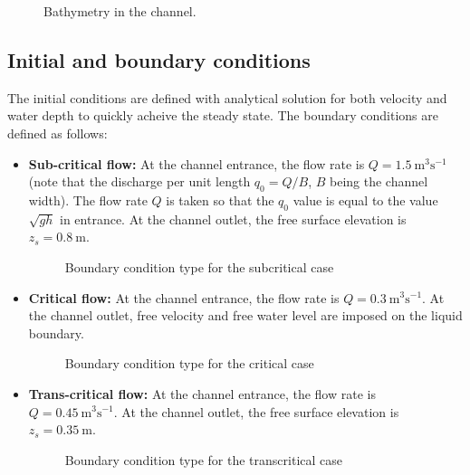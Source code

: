 \begin{figure}[H]
 \centering
 \caption{Bathymetry in the channel.}
 \label{t2d:bumpsub:fig:baty}
\end{figure}

\subsection{Initial and boundary conditions}
The initial conditions are defined with analytical solution for both velocity and water depth to quickly acheive the steady state.
The boundary conditions are defined as follows:
\begin{itemize}
\item {\bf Sub-critical flow:}
At the channel entrance, the flow rate is $Q =  1.5~\text{m}^3\text{s}^{-1}$
(note that the discharge per unit length $q_0=Q/B$, $B$ being the channel width).
The flow rate $Q$ is taken so that the $q_0$ value is equal to the value
$\sqrt{gh}$ in entrance. At the channel outlet, the free surface elevation is $ z_{s} = 0.8~\text{m}$.

\begin{figure}[!htbp]
 \centering
 \caption{Boundary condition type for the subcritical case}
 \label{t2d:bumpsub:fig:bc}
\end{figure}

\item {\bf Critical flow:}
At the channel entrance, the flow rate is $Q = 0.3~\text{m}^3\text{s}^{-1}$.
At the channel outlet, free velocity and free water level are imposed on the liquid boundary.

\begin{figure}[!htbp]
 \centering
 \caption{Boundary condition type for the critical case}
 \label{t2d:bumpcri:fig:bc}
\end{figure}

\item {\bf Trans-critical flow:}
At the channel entrance, the flow rate is $Q = 0.45~\text{m}^3\text{s}^{-1}$.
At the channel outlet, the free surface elevation is $z_{s} = 0.35~\text{m}$.

\begin{figure}[!htbp]
 \centering
 \caption{Boundary condition type for the transcritical case}
 \label{t2d:bumptrans:fig:bc}
\end{figure}

\end{itemize}

